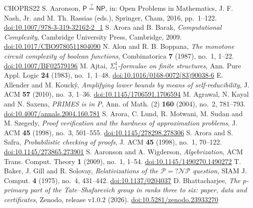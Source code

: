 \begingroup\raggedright\small
\begin{thebibliography}{CHOPRS22}
 S. Aaronson, \emph{$\mathsf P\overset{?}{=}\mathsf{NP}$}, in: Open Problems in Mathematics, J. F. Nash, Jr. and M. Th. Rassias (eds.), Springer, Cham, 2016, pp.~1--122. \href{https://doi.org/10.1007/978-3-319-32162-2_1}{doi:10.1007/978-3-319-32162-2\_1}
 S. Arora and B. Barak, \emph{Computational Complexity}, Cambridge University Press, Cambridge, 2009. \href{https://doi.org/10.1017/CBO9780511804090}{doi:10.1017/CBO9780511804090}
 N. Alon and R. B. Boppana, \emph{The monotone circuit complexity of boolean functions}, Combinatorica \textbf{7} (1987), no.~1, 1--22. \href{https://doi.org/10.1007/BF02579196}{doi:10.1007/BF02579196}
 M. Ajtai, \emph{$\Sigma^1_1$-formulae on finite structures}, Ann. Pure Appl. Logic \textbf{24} (1983), no.~1, 1--48. \href{https://doi.org/10.1016/0168-0072(83)90038-6}{doi:10.1016/0168-0072(83)90038-6}
 E. Allender and M. Kouck{\'y}, \emph{Amplifying lower bounds by means of self-reducibility}, J. ACM \textbf{57} (2010), no.~3, 1--36. \href{https://doi.org/10.1145/1706591.1706594}{doi:10.1145/1706591.1706594}
 M. Agrawal, N. Kayal and N. Saxena, \emph{PRIMES is in P}, Ann. of Math. (2) \textbf{160} (2004), no.~2, 781--793. \href{https://doi.org/10.4007/annals.2004.160.781}{doi:10.4007/annals.2004.160.781}
 S. Arora, C. Lund, R. Motwani, M. Sudan and M. Szegedy, \emph{Proof verification and the hardness of approximation problems}, J. ACM \textbf{45} (1998), no.~3, 501--555. \href{https://doi.org/10.1145/278298.278306}{doi:10.1145/278298.278306}
 S. Arora and S. Safra, \emph{Probabilistic checking of proofs}, J. ACM \textbf{45} (1998), no.~1, 70--122. \href{https://doi.org/10.1145/273865.273901}{doi:10.1145/273865.273901}
 S. Aaronson and A. Wigderson, \emph{Algebrization}, ACM Trans. Comput. Theory \textbf{1} (2009), no.~1, 1--54. \href{https://doi.org/10.1145/1490270.1490272}{doi:10.1145/1490270.1490272}
 T. Baker, J. Gill and R. Solovay, \emph{Relativizations of the $\mathcal P=?\mathcal{NP}$ question}, SIAM J. Comput. \textbf{4} (1975), no.~4, 431--442. \href{https://doi.org/10.1137/0204037}{doi:10.1137/0204037}
 D. Bhattacharjee, \emph{The $p$-primary part of the Tate--Shafarevich group in ranks three to six: paper, data and certificates}, Zenodo, release v1.0.2 (2026). \href{https://doi.org/10.5281/zenodo.23933270}{doi:10.5281/zenodo.23933270}

\end{thebibliography}
